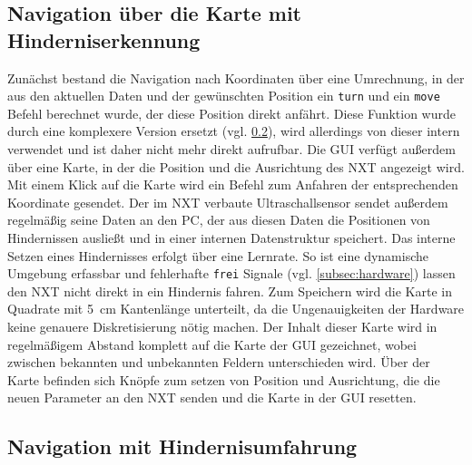 \documentclass[oneside,abstractoff,a4paper]{scrartcl}
\begin{document}
\subsection{Navigation über die Karte mit Hinderniserkennung}
\label{subsec:navigationhinderniskarte}
Zunächst bestand die Navigation nach Koordinaten über eine Umrechnung, in der aus den aktuellen Daten und der gewünschten Position ein \texttt{turn} und ein \texttt{move} Befehl berechnet wurde, der diese Position direkt anfährt. Diese Funktion wurde durch eine komplexere Version ersetzt (vgl. \cref{subsec:pathfinding}), wird allerdings von dieser intern verwendet und ist daher nicht mehr direkt aufrufbar.
Die GUI verfügt außerdem über eine Karte, in der die Position und die Ausrichtung des NXT angezeigt wird. Mit einem Klick auf die Karte wird ein Befehl zum Anfahren der entsprechenden Koordinate gesendet.
Der im NXT verbaute Ultraschallsensor sendet außerdem regelmäßig seine Daten an den PC, der aus diesen Daten die Positionen von Hindernissen ausließt und in einer internen Datenstruktur speichert. Das interne Setzen eines Hindernisses erfolgt über eine Lernrate. So ist eine dynamische Umgebung erfassbar und fehlerhafte \texttt{frei} Signale (vgl. \cref{subsec:hardware}) lassen den NXT nicht direkt in ein Hindernis fahren.
Zum Speichern wird die Karte in Quadrate mit \SI{5}{\centi\meter} Kantenlänge unterteilt, da die Ungenauigkeiten der Hardware keine genauere Diskretisierung nötig machen. Der Inhalt dieser Karte wird in regelmäßigem Abstand komplett auf die Karte der GUI gezeichnet, wobei zwischen bekannten und unbekannten Feldern unterschieden wird. Über der Karte befinden sich Knöpfe zum setzen von Position und Ausrichtung, die die neuen Parameter an den NXT senden und die Karte in der GUI resetten.

\subsection{Navigation mit Hindernisumfahrung}
\label{subsec:pathfinding}
\end{document}
